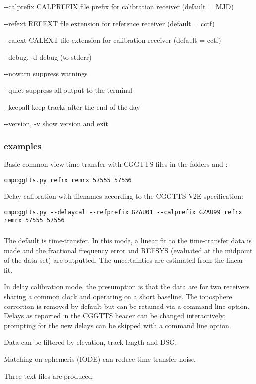 \begin{description*}
  \item[-{}-calprefix CALPREFIX] file prefix for calibration receiver (default = MJD)
  \item[-{}-refext REFEXT]       file extension for reference receiver (default = cctf)
  \item[-{}-calext CALEXT]       file extension for calibration receiver (default = cctf)
  \item[-{}-debug, -d]           debug (to stderr)
  \item[-{}-nowarn]              suppress warnings
  \item[-{}-quiet]               suppress all output to the terminal
  \item[-{}-keepall]             keep tracks after the end of the day
  \item[-{}-version, -v]         show version and exit
\end{description*}

\subsubsection{examples}

Basic common-view time transfer with CGGTTS files in the folders  and :
\begin{lstlisting}[mathescape=true]
cmpcggtts.py refrx remrx 57555 57556
\end{lstlisting}

Delay calibration with filenames according to the CGGTTS V2E specification:
\begin{lstlisting}[mathescape=true]
cmpcggtts.py --delaycal --refprefix GZAU01 --calprefix GZAU99 refrx remrx 57555 57556
\end{lstlisting}

\subsubsection{}

The default is time-transfer. In this mode, a linear fit to the time-transfer data is made and the 
fractional frequency error and REFSYS (evaluated at the midpoint of the data set) are outputted. 
The uncertainties are estimated from the linear fit.

In delay calibration mode, the presumption is that the data are for two receivers sharing a
common clock and operating on a short baseline. The ionosphere correction is removed by default
but can be retained via a command line option. Delays as reported in the CGGTTS header can be 
changed interactively; prompting for the new delays can be skipped with a command line option.


Data can be filtered by elevation, track length and DSG.

Matching on ephemeris (IODE) can reduce time-transfer noise.

Three text files are produced:




